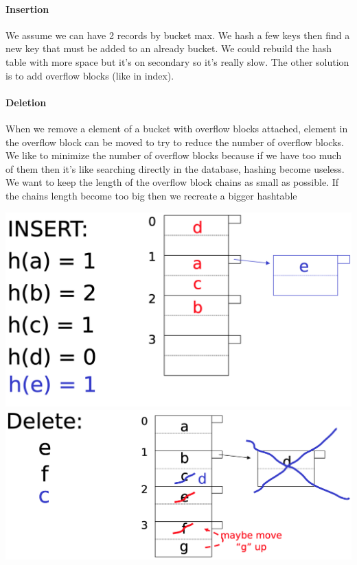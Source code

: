 \documentclass[12pt,a4paper]{article}
\begin{document}
\paragraph{Insertion}
We assume we can have 2 records by bucket max. We hash a few keys then find a new key that must be added to an already bucket. We could rebuild the hash table with more space but it's on secondary so it's really slow. The other solution is to add overflow blocks (like in index).

\paragraph{Deletion}
When we remove a element of a bucket with overflow blocks attached, element in the overflow block can be moved to try to reduce the number of overflow blocks.\\
We like to minimize the number of overflow blocks because if we have too much of them then it's like searching directly in the database, hashing become useless. We want to keep the length of the overflow block chains as small as possible. If the chains length become too big then we recreate a bigger hashtable\\

\begin{center}
\includegraphics[scale=0.2]{img/img43.png}
\includegraphics[scale=0.2]{img/img44.png}
\end{center}
\end{document}
